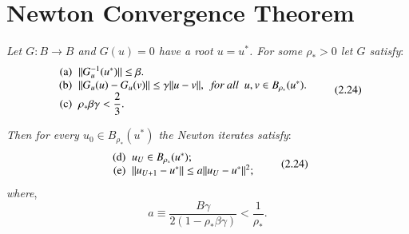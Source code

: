 \section{Newton Convergence Theorem}\label{chap2-sec2.24}%

\textit{Let $G: B \to B $ and $G(u)=0$ have a root
$u=u^{*}$.  For some $\rho_{*} > 0$ let $G$ satisfy}: 
\begin{equation*}
\begin{array}{r@{\;\;}l}
\text{(a)} & \| G^{-1}_{u} (u^{*}) \| \leq \beta.\\ 
\text{(b)} & \| G_u(u)-  G_u(v) \| \leq \gamma \| u-v \|,
\textit{ \ for all \ } u, v \in B_{\rho_{*}} (u^{*}).\\ 
\text{(c)} & \rho_{*} \beta \gamma < \dfrac{2}{3}.
\end{array}\tag{2.24}\label{chap2-sec2.24-eq2.24}
\end{equation*}
 
\textit{Then for every $u_0 \in B_{\rho_{*}} (u^{*})$ the
  Newton iterates satisfy}:
\begin{equation*}
\begin{array}{r@{\;\;}l}  
\text{(d)} & u_U \in B_{\rho_{*}}( u^{*});\\
\text{(e)} & \| u_{U+1} - u^{*}\| \leq a \| u_U - u^{*}\|^2;  
\end{array}\tag{2.24}\label{chap2-sec2.24-addeq2.24}
\end{equation*}
\textit{where}, 
$$
a \equiv \frac{B\gamma}{2(1-\rho_* \beta \gamma)}< \frac{1}{\rho _*}. 
$$

